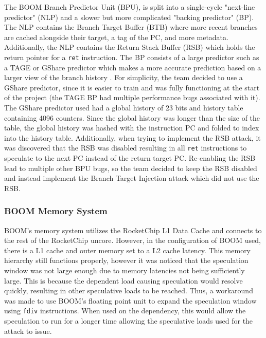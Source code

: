 The BOOM Branch Predictor Unit (BPU), is split into a single-cycle "next-line predictor" (NLP) and a
slower but more complicated "backing predictor" (BP). The NLP contains the Branch Target Buffer (BTB) 
where more recent branches are cached alongside their target, a tag of the PC, and more metadata. Additionally,
the NLP contains the Return Stack Buffer (RSB) which holds the return pointer for a {\tt ret} instruction. The BP
consists of a large predictor such as a TAGE or GShare predictor which makes a more accurate prediction based on
a larger view of the branch history \cite{b47}. For simplicity, the team decided to use a GShare predictor, since it is 
easier to train and was fully functioning at the start of the project (the TAGE BP had multiple performance bugs
associated with it). The GShare predictor used had a global history of 23 bits and history table containing
4096 counters. Since the global history was longer than the size of the table, the global history was hashed with
the instruction PC and folded to index into the history table. Additionally, when trying to
implement the RSB attack, it was discovered that the RSB was disabled resulting in all {\tt ret} instructions
to speculate to the next PC instead of the return target PC. Re-enabling the RSB lead to multiple other BPU bugs,
so the team decided to keep the RSB disabled and instead implement the Branch Target Injection attack which did not
use the RSB.

\subsubsection{BOOM Memory System}


BOOM's memory system utilizes the RocketChip L1 Data Cache and connects to the rest of the RocketChip
uncore. However, in the configuration of BOOM used, there is a L1 cache and outer memory set to a L2 cache
latency. This memory hierarchy still functions properly, however it was noticed that the speculation window
was not large enough due to memory latencies not being sufficiently large. This is because the
dependent load causing speculation would resolve quickly, resulting in other speculative loads to be reached.
Thus, a workaround was made to use BOOM's floating point unit to expand the speculation 
window using {\tt fdiv} instructions. When used on the dependency, this would allow the speculation
to run for a longer time allowing the speculative loads used for the attack to issue.

